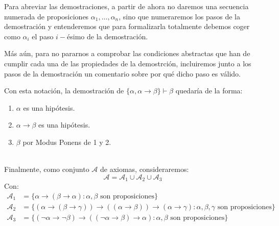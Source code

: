 \begin{notacion}
    Para abreviar las demostraciones, a partir de ahora no daremos una secuencia numerada de proposiciones $\alpha_1,\ldots,\alpha_n$, sino que numeraremos los pasos de la demostración y entenderemos que para formalizarla totalmente debemos coger como $\alpha_i$ el paso $i-$ésimo de la demostración.

    Más aún, para no pararnos a comprobar las condiciones abstractas que han de cumplir cada una de las propiedades de la demostrción, incluiremos junto a los pasos de la demostración un comentario sobre por qué dicho paso es válido.

    Con esta notación, la demostración de $\{\alpha,\alpha\to\beta\}\vdash \beta$ quedaría de la forma:
    \begin{enumerate}
        \item $\alpha$ es una hipótesis.
        \item $\alpha\to\beta$ es una hipótesis.
        \item $\beta$ por Modus Ponens de 1 y 2.
    \end{enumerate}
\end{notacion}~\\

\noindent
Finalmente, como conjunto $\mathcal{A}$ de axiomas, consideraremos:
\begin{equation*}
    \mathcal{A} = \mathcal{A}_1 \cup \mathcal{A}_2 \cup \mathcal{A}_3
\end{equation*}
Con:
\begin{align*}
    \mathcal{A}_1 &= \{\alpha\to(\beta\to\alpha) : \alpha,\beta \text{\ son proposiciones}\} \\
    \mathcal{A}_2 &= \{(\alpha\to(\beta\to\gamma))\to((\alpha\to\beta))\to(\alpha\to\gamma) : \alpha,\beta,\gamma \text{\ son proposiciones}\} \\
    \mathcal{A}_3 &= \{(\lnot\alpha\to\lnot\beta)\to((\lnot\alpha\to\beta)\to\alpha) : \alpha,\beta \text{\ son proposiciones}\}
\end{align*}

